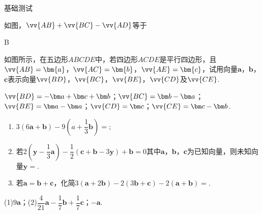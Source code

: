   \begin{exercise}{基础测试}
    \item
      如图，$\vv{AB}+\vv{BC}-\vv{AD}$等于\xz
      \begin{minipage}[b]{0.7\linewidth}
      \end{minipage}\hfill
      \begin{minipage}[h]{0.3\linewidth}
      \end{minipage}
      \begin{answer}
        B
      \end{answer}
    \item
      如图所示，在五边形$ABCDE$中，若四边形$ACDE$是平行四边形，且$\vv{AB}=\bm{a}$，$\vv{AC}=\bm{b}$，$\vv{AE}=\bm{c}$，试用向量$\bm a$，$\bm b$，$\bm c$表示向量$\vv{BD}$，$\vv{BC}$，$\vv{BE}$，$\vv{CD}$及$\vv{CE}$.
      \begin{flushright}
      \end{flushright}
      \begin{answer}
        $\vv{BD}=-\bm a+\bm c+\bm b$；$\vv{BC}=\bm b-\bm a$；$\vv{BE}=\bm a-\bm a$；$\vv{CD}=\bm c$；$\vv{CE}=\bm c-\bm b$.
      \end{answer}
    \item
      \begin{enumerate}[label=\arabic*)]
        \item $3(6\bm{a}+\bm{b})-9(a+\dfrac13\bm{b})=$\tk;
        \item 若$2(\bm{y}-\dfrac13\bm{a})-\dfrac12(\bm c+\bm b-3\bm y)+\bm b=0$其中$\bm a$，$\bm b$，$\bm c$为已知向量，则未知向量$\bm y=$\tk.
        \item 若$\bm a=\bm b+\bm c$，化简$3(\bm a+2\bm b)-2(3\bm b+\bm c)-2(\bm a+\bm b)=$\tk.
      \end{enumerate}
      \begin{answer}
        (1)$9\bm a$；(2)$\dfrac4{21}\bm a-\dfrac17\bm b+\dfrac17\bm c$；$-\bm a$.
      \end{answer}
  \end{exercise}
\newpage
